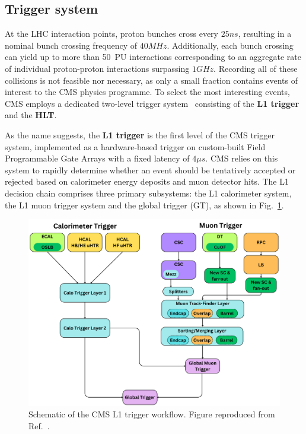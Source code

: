 \subsection{Trigger system}

At the \ac{LHC} interaction points, proton bunches cross every $25\unit{ns}$, resulting in a nominal bunch crossing frequency of $40\unit{MHz}$. Additionally, each bunch crossing can yield up to more than 50~\ac{PU} interactions corresponding to an aggregate rate of individual proton-proton interactions surpassing $1\unit{GHz}$. Recording all of these collisions is not feasible nor necessary, as only a small fraction contains events of interest to the \ac{CMS} physics programme. To select the most interesting events, \ac{CMS} employs a dedicated two-level trigger system~\cite{CMS_Trigger} consisting of the \textbf{\ac{L1} trigger} and the \textbf{\ac{HLT}}.

As the name suggests, the \textbf{\ac{L1} trigger} is the first level of the \ac{CMS} trigger system, implemented as a hardware-based trigger on custom-built Field Programmable Gate Arrays with a fixed latency of $4\unit{\mu s}$. \ac{CMS} relies on this system to rapidly determine whether an event should be tentatively accepted or rejected based on calorimeter energy deposits and muon detector hits. The \ac{L1} decision chain comprises three primary subsystems: the \ac{L1} calorimeter system, the \ac{L1} muon trigger system and the global trigger (GT), as shown in Fig.~\ref{Figure:Chapter3_CMS_L1_Trigger}.

\begin{figure}[!htbp]
\centering
\includegraphics[width= 1.0\textwidth]{Figures/Chapter3/CMS_L1_Trigger.pdf}
\caption[Schematic of the CMS Level-1 trigger workflow]{Schematic of the \ac{CMS} \ac{L1} trigger workflow. Figure reproduced from Ref.~\cite{CMS_L1_Trigger}.}
\label{Figure:Chapter3_CMS_L1_Trigger}
\end{figure}

